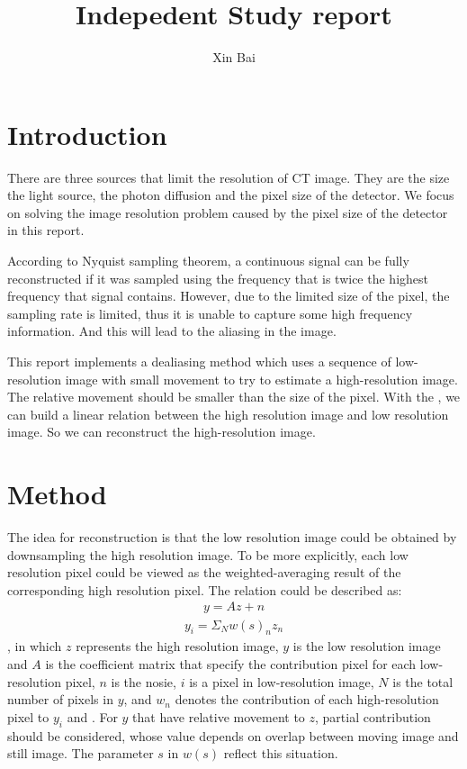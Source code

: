 \documentclass{article}
\begin{document}
\title{Indepedent Study report}
\author{Xin Bai}
\date{}
\maketitle
\section{Introduction}

There are three sources that limit the resolution of CT image. They are the size the light source, the photon diffusion and the pixel size of the detector.  We focus on solving the image resolution problem caused by the pixel size of the detector in this report. 

According to Nyquist sampling theorem, a continuous signal can be fully reconstructed if it was sampled using the frequency that is twice the highest frequency that signal contains. However, due to the limited size of the pixel, the sampling rate is limited, thus it is unable to capture some high frequency information. And this will lead to the aliasing in the image. 

This report implements a dealiasing method which uses a sequence of low-resolution image with small movement to try to estimate a high-resolution image. The relative movement should be smaller than the size of the pixel. With the , we can build a linear relation between the high resolution image and low resolution image. So we can reconstruct the high-resolution image.

\section{Method}
The idea for reconstruction is that the low resolution image could be obtained by downsampling the high resolution image. To be more explicitly, each low resolution pixel could be viewed as the weighted-averaging result of the corresponding high resolution pixel. The relation could be described as:
	\begin{align}
		y = Az + n
	\end{align}
	\begin{align}
		y_{i}=\Sigma_{N}w(s)_{n}z_{n}
	\end{align}
, in which $z$ represents the high resolution image, $y$ is the low resolution image and $A$ is the coefficient matrix that specify the contribution pixel for each low-resolution pixel, $n$ is the nosie, $i$ is a pixel in low-resolution image, $N$ is the total number of pixels in $y$, and $w_n$ denotes the contribution of each high-resolution pixel to $y_i$ and . For $y$ that have relative movement to $z$, partial contribution should be considered, whose value depends on overlap between moving image and still image. The parameter $s$ in $w(s)$ reflect this situation. 
\end{document}
